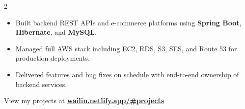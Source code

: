 \documentclass[10pt,a4paper,ragged2e,withhyper]{altacv}
\begin{document}
\begin{paracol}{2}
\begin{itemize}
    \item Built backend REST APIs and e-commerce platforms using \textbf{Spring Boot}, \textbf{Hibernate}, and \textbf{MySQL}.
    \item Managed full AWS stack including EC2, RDS, S3, SES, and Route 53 for production deployments.
    \item Delivered features and bug fixes on schedule with end-to-end ownership of backend services.
\end{itemize}

            \divider


            View my projects at \href{https://wailin.netlify.app/\#projects}{\textbf{wailin.netlify.app/\#projects}}

    \end{paracol}
\end{document}
